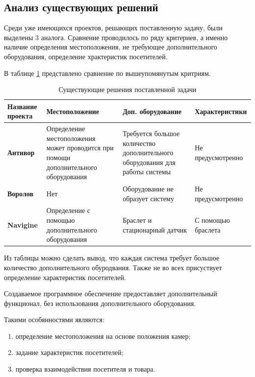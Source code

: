 \subsection{Анализ существующих решений}

Среди уже имеющихся проектов, решающих поставленную задачу, были выделены 3 аналога.
Сравнение проводилось по ряду критериев, а именно наличие определения местоположения, 
не требующее дополнительного оборудования, определение храктеристик посетителей.

В таблице \ref{decisions} представлено сравнение по вышеупомянутым критриям.

\begin{table}[ht!]
	\centering
	\caption{Существующие решения поставленной задачи}
	\label{decisions}
	\begin{tabular}{|p{2.6cm}|p{5cm}|p{4cm}|p{4cm}|}
			\hline
			\textbf{Название проекта} & \textbf{Местоположение} & \textbf{Доп. оборудование} & \textbf{Характеристики}\\
			\hline
			\textbf{Антивор \cite{Antivor}} & Определение местоположения может проводится при помощи дополнительного оборудования 
			& Требуется большое количество дополнительного оборудования для работы системы
			 & Не предусмотренно\\
			\hline

			\textbf{Воролов \cite{VOROLOV}} & Нет 
			& Оборудование не образует систему
			 & Не предусмотренно\\
			\hline

			\textbf{Navigine \cite{Navigine}} & Определение с помощью дополнительного оборудования 
			& Браслет и стационарный датчик
			 & С помощью браслета\\
			\hline
	\end{tabular}
\end{table}


Из таблицы можно сделать вывод, что каждая система требует большое количество дополнительного обуродвания.
Также не во всех присуствует определение характеристик посетителей.

Создаваемое программное обеспечение предоставляет дополнительный функционал, без использования дополнительного оборудования.

Такими особянностями являются:

\begin{enumerate}[label=\arabic*.]
	\item определение местоположения на основе положения камер;
	\item задание характеристик посетителей;
	\item проверка взаимодействия посетителя и товара.
\end{enumerate}

